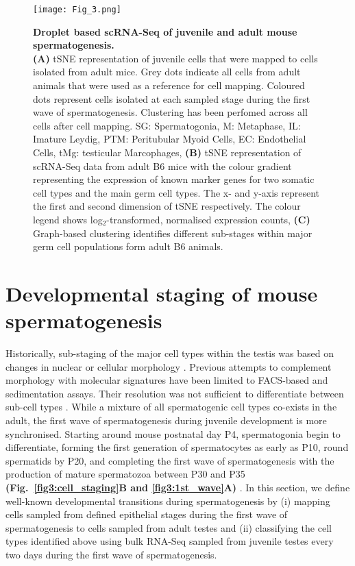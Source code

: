 \newpage

\begin{figure}[!h]
\centering
\texttt{[image: Fig\_3.png]}
\caption[Droplet based scRNA-Seq of juvenile and adult mouse spermatogenesis]{\textbf{Droplet based scRNA-Seq of juvenile and adult mouse spermatogenesis.}\\
\textbf{(A)} tSNE representation of juvenile cells that were mapped to cells isolated from adult mice. 
Grey dots indicate all cells from adult animals that were used as a reference for cell mapping. 
Coloured dots represent cells isolated at each sampled stage during the first wave of spermatogenesis. 
Clustering has been perfomed across all cells after cell mapping. 
SG: Spermatogonia, M: Metaphase, IL: Imature Leydig, PTM: Peritubular Myoid Cells, EC: Endothelial Cells, tMg: testicular Marcophages, 
\textbf{(B)} tSNE representation of scRNA-Seq data from adult B6 mice with the colour gradient representing the expression of known marker genes for two somatic cell types and the main germ cell types. 
The x- and y-axis represent the first and second dimension of tSNE respectively. 
The colour legend shows log$_2$-transformed, normalised expression counts, 
\textbf{(C)} Graph-based clustering identifies different sub-stages within major germ cell populations form adult B6 animals. 
}
\label{fig3:cell_types}
\end{figure}

\newpage

\section{Developmental staging of mouse spermatogenesis}

Historically, sub-staging of the major cell types within the testis was based on changes in nuclear or cellular morphology \citep{Oakberg1956,  Oakberg1956a}. 
Previous attempts to complement morphology with molecular signatures have been limited to FACS-based and sedimentation assays. 
Their resolution was not sufficient to differentiate between sub-cell types \citep{Bastos2005, Gaysinskaya2014, Lam1970, Meistrich1977, Romrell1976, Soumillon2013}. 
While a mixture of all spermatogenic cell types co-exists in the adult, the first wave of spermatogenesis during juvenile development is more synchronised. 
Starting around mouse postnatal day P4, spermatogonia begin to differentiate, forming the first generation of spermatocytes as early as P10, round spermatids by P20, and completing the first wave of spermatogenesis with the production of mature spermatozoa between P30 and P35 \textbf{(Fig.~\ref{fig3:cell_staging}B and \ref{fig3:1st_wave}A)} \citep{Bellve1977, Janca1986, Nebel1961}. 
In this section, we define well-known developmental transitions during spermatogenesis by (i) mapping cells sampled from defined epithelial stages during the first wave of spermatogenesis to cells sampled from adult testes and (ii) classifying the cell types identified above using bulk RNA-Seq sampled from juvenile testes every two days during the first wave of spermatogenesis. 


